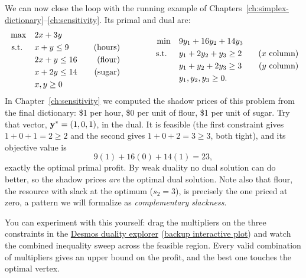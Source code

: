 We can now close the loop with the running example of Chapters~\ref{ch:simplex-dictionary}--\ref{ch:sensitivity}. Its primal and dual are:
\[
\begin{aligned}
\max \quad & 2x + 3y \\
\text{ s.t. } \quad
& x + y \leq 9 \quad & \text{(hours)} \\
& 2x + y \leq 16 \quad & \text{(flour)} \\
& x + 2y \leq 14 \quad & \text{(sugar)} \\
& x, y \geq 0
\end{aligned}
\qquad\qquad
\begin{aligned}
\min \quad & 9y_1 + 16y_2 + 14y_3 \\
\text{ s.t. } \quad
& y_1 + 2y_2 + y_3 \geq 2 \quad & \text{($x$ column)} \\
& y_1 + y_2 + 2y_3 \geq 3 \quad & \text{($y$ column)} \\
& y_1, y_2, y_3 \geq 0.
\end{aligned}
\]
In Chapter~\ref{ch:sensitivity} we computed the shadow prices of this problem from the final dictionary: \$1 per hour, \$0 per unit of flour, \$1 per unit of sugar. Try that vector, $\mathbf{y}^* = (1, 0, 1)$, in the dual. It is feasible (the first constraint gives $1 + 0 + 1 = 2 \geq 2$ and the second gives $1 + 0 + 2 = 3 \geq 3$, both tight), and its objective value is
\[
9(1) + 16(0) + 14(1) = 23,
\]
exactly the optimal primal profit. By weak duality no dual solution can do better, so the shadow prices \emph{are} the optimal dual solution. Note also that flour, the resource with slack at the optimum ($s_2 = 3$), is precisely the one priced at zero, a pattern we will formalize as \emph{complementary slackness}.

You can experiment with this yourself: drag the multipliers on the three constraints in the \href{https://www.desmos.com/calculator/d2d5c861c3}{Desmos duality explorer} (\href{https://open-optimization.github.io/open-optimization-or-book/interactive-figures/lp-duality-explorer.html}{backup interactive plot}) and watch the combined inequality sweep across the feasible region. Every valid combination of multipliers gives an upper bound on the profit, and the best one touches the optimal vertex.

